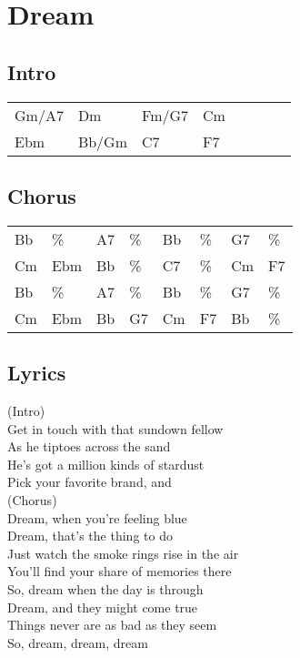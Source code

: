 \section{Dream}


\subsection*{Intro}


\begin{tabular}{l l l l l l l l}
Gm/A7 & Dm & Fm/G7 & Cm \\ 
Ebm & Bb/Gm & C7 & F7 \\ 
\end{tabular}


\subsection*{Chorus}


\begin{tabular}{l l l l l l l l}
Bb & \% & A7 & \% & Bb & \% & G7 & \% \\ 
Cm & Ebm & Bb & \% & C7 & \% & Cm & F7 \\ 
Bb & \% & A7 & \% & Bb & \% & G7 & \% \\ 
Cm & Ebm & Bb & G7 & Cm & F7 & Bb & \% \\ 
\end{tabular}


\subsection*{Lyrics}


(Intro) \\ 
Get in touch with that sundown fellow \\ 
As he tiptoes across the sand \\ 
He's got a million kinds of stardust \\ 
Pick your favorite brand, and \\ 

(Chorus) \\ 
Dream, when you're feeling blue \\ 
Dream, that's the thing to do \\ 
Just watch the smoke rings rise in the air \\ 
You'll find your share of memories there \\ 

So, dream when the day is through \\ 
Dream, and they might come true \\ 
Things never are as bad as they seem \\ 
So, dream, dream, dream \\ 
